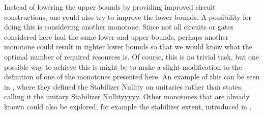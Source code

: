 \documentclass[12pt]{dalthesis}
\begin{document}
Instead of lowering the upper bounds by providing improved circuit constructions, one could also try to improve the lower bounds. A possibility for doing this is considering another monotone. Since not all circuits or gates considered here had the same lower and upper bounds, perhaps another monotone could result in tighter lower bounds so that we would know what the optimal number of required resources is. Of course, this is no trivial task, but one possible way to achieve this is might be to make a slight modification to the definition of one of the monotones presented here. An example of this can be seen in \cite{jiang2021lower}, where they defined the Stabilizer Nullity on unitaries rather than states, calling it the unitary Stabilizer Nullityyyyy. Other monotones that are already known could also be explored, for example the stabilizer extent, introduced in \cite{beverland2019lower}.



\end{document}

